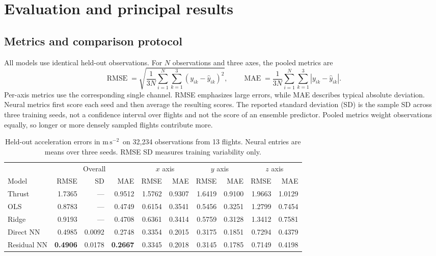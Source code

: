 \documentclass[10pt,letterpaper]{article}
\newcommand{\unit}{\ensuremath{\mathrm{m\,s^{-2}}}}
\begin{document}
\clearpage
\section{Evaluation and principal results}
\subsection{Metrics and comparison protocol}
All models use identical held-out observations. For $N$ observations and three axes, the pooled metrics are
\begin{equation}
 \operatorname{RMSE}=\sqrt{\frac{1}{3N}\sum_{i=1}^N\sum_{k=1}^3(y_{ik}-\hat y_{ik})^2},
 \qquad \operatorname{MAE}=\frac{1}{3N}\sum_{i=1}^N\sum_{k=1}^3|y_{ik}-\hat y_{ik}|.
\end{equation}
Per-axis metrics use the corresponding single channel. RMSE emphasizes large errors, while MAE describes typical absolute deviation. Neural metrics first score each seed and then average the resulting scores. The reported standard deviation (SD) is the sample SD across three training seeds, not a confidence interval over flights and not the score of an ensemble predictor. Pooled metrics weight observations equally, so longer or more densely sampled flights contribute more.

\begin{table}[H]
\centering\small\setlength{\tabcolsep}{3.8pt}
\caption{Held-out acceleration errors in \unit\ on 32,234 observations from 13 flights. Neural entries are means over three seeds. RMSE SD measures training variability only.}
\begin{tabular}{@{}lrrrrrrrrr@{}}
\toprule
 &\multicolumn{3}{c}{Overall}&\multicolumn{2}{c}{$x$ axis}&\multicolumn{2}{c}{$y$ axis}&\multicolumn{2}{c}{$z$ axis}\\
\cmidrule(lr){2-4}\cmidrule(lr){5-6}\cmidrule(lr){7-8}\cmidrule(l){9-10}
Model & RMSE & SD & MAE & RMSE & MAE & RMSE & MAE & RMSE & MAE\\
\midrule
Thrust &1.7365& --- &0.9512&1.5762&0.9307&1.6419&0.9100&1.9663&1.0129\\
OLS &0.8783& --- &0.4749&0.6154&0.3541&0.5456&0.3251&1.2799&0.7454\\
Ridge &0.9193& --- &0.4708&0.6361&0.3414&0.5759&0.3128&1.3412&0.7581\\
Direct NN &0.4985&0.0092&0.2748&0.3354&0.2015&0.3175&0.1851&0.7294&0.4379\\
Residual NN &\textbf{0.4906}&0.0178&\textbf{0.2667}&0.3345&0.2018&0.3145&0.1785&0.7149&0.4198\\
\bottomrule
\end{tabular}
\label{tab:overall}
\end{table}
\end{document}
